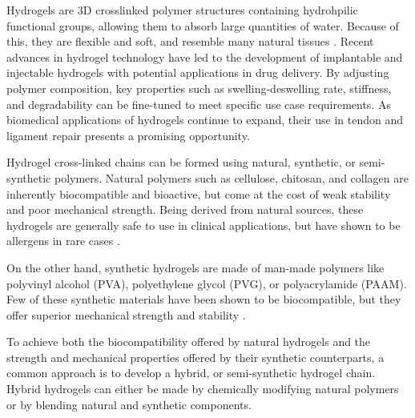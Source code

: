 Hydrogels are 3D crosslinked polymer structures containing hydrohpilic functional groups, allowing them to absorb large quantities of water. Because of this, they are flexible and soft, and resemble many natural tissues \autocite{hoHydrogelsPropertiesApplications2022}.
Recent advances in hydrogel technology have led to the development of implantable and injectable hydrogels with potential applications in drug delivery. By adjusting polymer composition, key properties such as swelling-deswelling rate, stiffness, and degradability can be fine-tuned to meet specific use case requirements. As biomedical applications of hydrogels continue to expand, their use in tendon and ligament repair presents a promising opportunity.

Hydrogel cross-linked chains can be formed using natural, synthetic, or semi-synthetic polymers. Natural polymers such as cellulose, chitosan, and collagen are inherently biocompatible and bioactive, but come at the cost of weak stability and poor mechanical strength. Being derived from natural sources, these hydrogels are generally safe to use in clinical applications, but have shown to be allergens in rare cases \autocite{hoHydrogelsPropertiesApplications2022}.

On the other hand, synthetic hydrogels are made of man-made polymers like polyvinyl alcohol (PVA), polyethylene glycol (PVG), or polyacrylamide (PAAM). Few of these synthetic materials have been shown to be biocompatible, but they offer superior mechanical strength and stability \autocite{hoHydrogelsPropertiesApplications2022}.

To achieve both the biocompatibility offered by natural hydrogels and the strength and mechanical properties offered by their synthetic counterparts, a common approach is to develop a hybrid, or semi-synthetic hydrogel chain. Hybrid hydrogels can either be made by chemically modifying natural polymers or by blending natural and synthetic components.